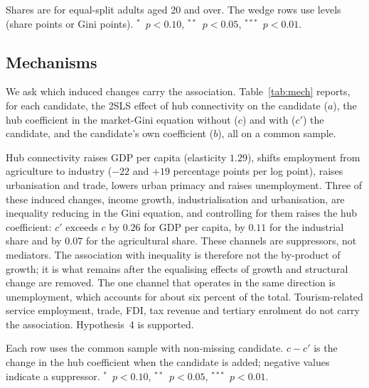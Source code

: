\documentclass[12pt]{article}
\newcommand{\sym}[1]{\ensuremath{^{#1}}}
\begin{document}
\begin{table}[H]\centering\caption{Distributional location: WID income shares and the redistribution wedge (hub connectivity, Feyrer instrument).}\label{tab:tails}
\begin{threeparttable}\small
\begin{tablenotes}\footnotesize\item Shares are for equal-split adults aged 20 and over. The wedge rows use levels (share points or Gini points). \sym{*}~$p<0.10$, \sym{**}~$p<0.05$, \sym{***}~$p<0.01$.\end{tablenotes}\end{threeparttable}\end{table}

\subsection{Mechanisms}
\label{sec:mech}
We ask which induced changes carry the association. Table~\ref{tab:mech} reports, for each candidate, the 2SLS effect of hub connectivity on the candidate ($a$), the hub coefficient in the market-Gini equation without ($c$) and with ($c'$) the candidate, and the candidate's own coefficient ($b$), all on a common sample.

Hub connectivity raises GDP per capita (elasticity $1.29$), shifts employment from agriculture to industry ($-22$ and $+19$ percentage points per log point), raises urbanisation and trade, lowers urban primacy and raises unemployment. Three of these induced changes, income growth, industrialisation and urbanisation, are inequality reducing in the Gini equation, and controlling for them raises the hub coefficient: $c'$ exceeds $c$ by $0.26$ for GDP per capita, by $0.11$ for the industrial share and by $0.07$ for the agricultural share. These channels are suppressors, not mediators. The association with inequality is therefore not the by-product of growth; it is what remains after the equalising effects of growth and structural change are removed. The one channel that operates in the same direction is unemployment, which accounts for about six percent of the total. Tourism-related service employment, trade, FDI, tax revenue and tertiary enrolment do not carry the association. Hypothesis~4 is supported.

\begin{table}[H]\centering\caption{Mechanisms: induced changes and the residual association with the market Gini (2SLS, Feyrer instrument, robust SE).}\label{tab:mech}
\begin{threeparttable}\small
\begin{tablenotes}\footnotesize\item Each row uses the common sample with non-missing candidate. $c-c'$ is the change in the hub coefficient when the candidate is added; negative values indicate a suppressor. \sym{*}~$p<0.10$, \sym{**}~$p<0.05$, \sym{***}~$p<0.01$.\end{tablenotes}\end{threeparttable}\end{table}
\end{document}
